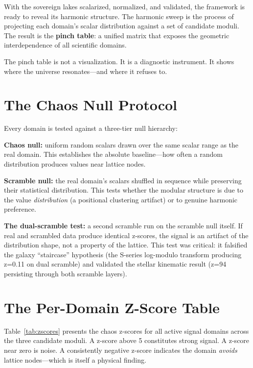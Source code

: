 \documentclass[11pt, letterpaper, openany]{book}
\begin{document}
With the sovereign lakes scalarized, normalized, and validated, the framework is ready to
reveal its harmonic structure. The harmonic sweep is the process of projecting each domain's
scalar distribution against a set of candidate moduli. The result is the \textbf{pinch table}:
a unified matrix that exposes the geometric interdependence of all scientific domains.

The pinch table is not a visualization.
It is a diagnostic instrument.
It shows where the universe resonates---and where it refuses to.

\section*{The Chaos Null Protocol}

Every domain is tested against a three-tier null hierarchy:

\textbf{Chaos null:} uniform random scalars drawn over the same scalar range as the real domain.
This establishes the absolute baseline---how often a random distribution produces values near
lattice nodes.

\textbf{Scramble null:} the real domain's scalars shuffled in sequence while preserving their
statistical distribution. This tests whether the modular structure is due to the value
\emph{distribution} (a positional clustering artifact) or to genuine harmonic preference.

\textbf{The dual-scramble test:} a second scramble run on the scramble null itself. If real and
scrambled data produce identical z-scores, the signal is an artifact of the distribution
shape, not a property of the lattice. This test was critical: it falsified the galaxy
``staircase'' hypothesis (the S-series log-modulo transform producing z=0.11 on dual scramble)
and validated the stellar kinematic result (z=94 persisting through both scramble layers).

\section*{The Per-Domain Z-Score Table}

Table~\ref{tab:zscores} presents the chaos z-scores for all active signal domains across the
three candidate moduli. A z-score above 5 constitutes strong signal. A z-score near zero is
noise. A consistently negative z-score indicates the domain \emph{avoids} lattice nodes---which
is itself a physical finding.
\end{document}
